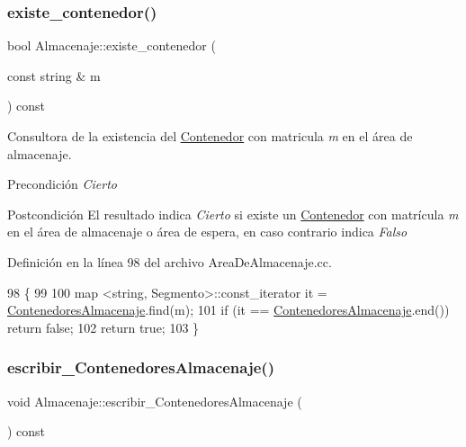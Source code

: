 \subsubsection{\texorpdfstring{existe\+\_\+contenedor()}{existe\_contenedor()}}
{\footnotesize\ttfamily bool Almacenaje\+::existe\+\_\+contenedor (\begin{DoxyParamCaption}\item[{const string \&}]{m }\end{DoxyParamCaption}) const}



Consultora de la existencia del \hyperlink{class_contenedor}{Contenedor} con matricula {\itshape m} en el área de almacenaje. 

\begin{DoxyPrecond}{Precondición}
{\itshape Cierto} 
\end{DoxyPrecond}
\begin{DoxyPostcond}{Postcondición}
El resultado indica {\itshape Cierto} si existe un \hyperlink{class_contenedor}{Contenedor} con matrícula {\itshape m} en el área de almacenaje o área de espera, en caso contrario indica {\itshape Falso} 
\end{DoxyPostcond}


Definición en la línea 98 del archivo Area\+De\+Almacenaje.\+cc.


\begin{DoxyCode}
98                                                          \{
99     
100     map <string, Segmento>::const\_iterator it = \hyperlink{class_almacenaje_ab3cfe0feaf244094a7e2c5225ee681e6}{ContenedoresAlmacenaje}.find(m);
101     \textcolor{keywordflow}{if} (it == \hyperlink{class_almacenaje_ab3cfe0feaf244094a7e2c5225ee681e6}{ContenedoresAlmacenaje}.end()) \textcolor{keywordflow}{return} \textcolor{keyword}{false};
102     \textcolor{keywordflow}{return} \textcolor{keyword}{true};
103 \}
\end{DoxyCode}
\mbox{\label{class_almacenaje_a5de7fa3a41e402feecac670c226a058f}} 
\subsubsection{\texorpdfstring{escribir\+\_\+\+Contenedores\+Almacenaje()}{escribir\_ContenedoresAlmacenaje()}}
{\footnotesize\ttfamily void Almacenaje\+::escribir\+\_\+\+Contenedores\+Almacenaje (\begin{DoxyParamCaption}{ }\end{DoxyParamCaption}) const}



